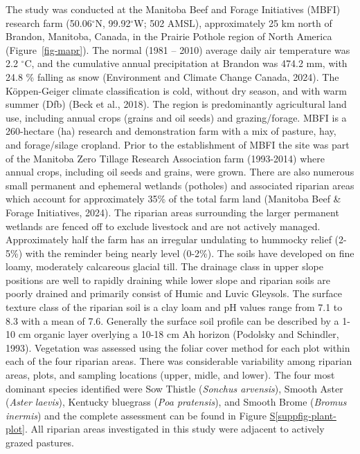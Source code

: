 \documentclass[
]{agujournal2019}
\newcommand*\quartosuppfigref[1]{Figure \hyperref[#1]{S\ref{#1}}}
\begin{document}
The study was conducted at the Manitoba Beef and Forage Initiatives
(MBFI) research farm (50.06\(^\circ\)N, 99.92\(^\circ\)W; 502 AMSL),
approximately 25 km north of Brandon, Manitoba, Canada, in the Prairie
Pothole region of North America (Figure~\ref{fig-mapr}). The normal
(1981 -- 2010) average daily air temperature was 2.2 \(^\circ\)C, and
the cumulative annual precipitation at Brandon was 474.2 mm, with 24.8
\% falling as snow (Environment and Climate Change Canada, 2024). The
Köppen-Geiger climate classification is cold, without dry season, and
with warm summer (Dfb) (Beck et al., 2018). The region is predominantly
agricultural land use, including annual crops (grains and oil seeds) and
grazing/forage. MBFI is a 260-hectare (ha) research and demonstration
farm with a mix of pasture, hay, and forage/silage cropland. Prior to
the establishment of MBFI the site was part of the Manitoba Zero Tillage
Research Association farm (1993-2014) where annual crops, including oil
seeds and grains, were grown. There are also numerous small permanent
and ephemeral wetlands (potholes) and associated riparian areas which
account for approximately 35\% of the total farm land (Manitoba Beef \&
Forage Initiatives, 2024). The riparian areas surrounding the larger
permanent wetlands are fenced off to exclude livestock and are not
actively managed. Approximately half the farm has an irregular
undulating to hummocky relief (2-5\%) with the reminder being nearly
level (0-2\%). The soils have developed on fine loamy, moderately
calcareous glacial till. The drainage class in upper slope positions are
well to rapidly draining while lower slope and riparian soils are poorly
drained and primarily consist of Humic and Luvic Gleysols. The surface
texture class of the riparian soil is a clay loam and pH values range
from 7.1 to 8.3 with a mean of 7.6. Generally the surface soil profile
can be described by a 1-10 cm organic layer overlying a 10-18 cm Ah
horizon (Podolsky and Schindler, 1993). Vegetation was assessed using
the foliar cover method for each plot within each of the four riparian
areas. There was considerable variability among riparian areas, plots,
and sampling locations (upper, midle, and lower). The four most dominant
species identified were Sow Thistle (\emph{Sonchus arvensis}), Smooth
Aster (\emph{Aster laevis}), Kentucky bluegrass (\emph{Poa pratensis}),
and Smooth Brome (\emph{Bromus inermis}) and the complete assessment can
be found in \quartosuppfigref{suppfig-plant-plot}. All riparian areas
investigated in this study were adjacent to actively grazed pastures.
\end{document}
